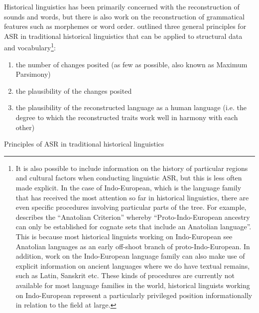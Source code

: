 \documentclass[12pt,letterpaper]{article}
\begin{document}
Historical linguistics has been primarily concerned with the reconstruction of sounds and words, but there is also work on the reconstruction of grammatical features such as morphemes or word order. \citet[17-22]{clark1973aspects} outlined three general principles for ASR in traditional historical linguistics that can be applied to structural data and vocabulary\footnote{It is also possible to include information on the history of particular regions and cultural factors when conducting linguistic ASR, but this is less often made explicit. In the case of Indo-European, which is the language family that has received the most attention so far in historical linguistics, there are even specific procedures involving particular parts of the tree. For example, \citet[6]{goldstein_2022} describes the ``Anatolian Criterion'' whereby ``Proto-Indo-European ancestry can only be established for cognate sets that include an Anatolian language''. This is because most historical linguists working on Indo-European see Anatolian languages as an early off-shoot branch of proto-Indo-European. In addition, work on the Indo-European language family can also make use of explicit information on ancient languages where we do have textual remains, such as Latin, Sanskrit etc. These kinds of procedures are currently not available for most language families in the world, historical linguists working on Indo-European represent a particularly privileged position informationally in relation to the field at large.}:

\begin{mylist}
\begin{enumerate}[label=(\roman*)]
\item the number of changes posited (as few as possible, also known as Maximum Parsimony)
\item the plausibility of the changes posited
\item the plausibility of the reconstructed language as a human language (i.e. the degree to which the reconstructed traits work well in harmony with each other)
\end{enumerate}
\caption{Principles of ASR in traditional historical linguistics}
\label{HL_principles_asr}
\end{mylist}

\end{document}
